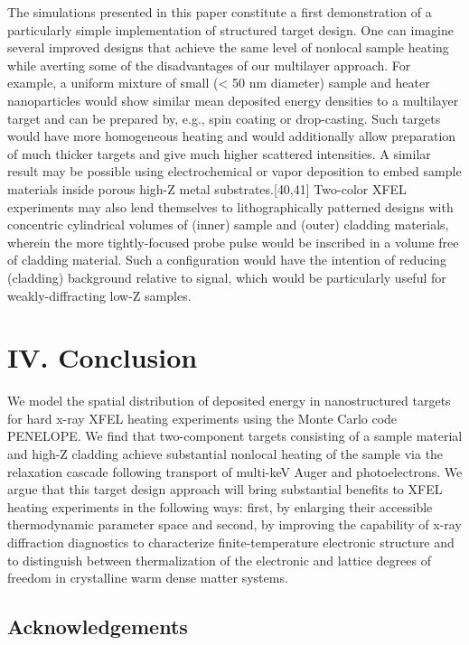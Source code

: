 The simulations presented in this paper constitute a first demonstration
of a particularly simple implementation of structured target design. One
can imagine several improved designs that achieve the same level of
nonlocal sample heating while averting some of the disadvantages of our
multilayer approach. For example, a uniform mixture of small
(\textless{} 50 nm diameter) sample and heater nanoparticles would show
similar mean deposited energy densities to a multilayer target and can
be prepared by, e.g., spin coating or drop-casting. Such targets would
have more homogeneous heating and would additionally allow preparation
of much thicker targets and give much higher scattered intensities. A
similar result may be possible using electrochemical or vapor deposition
to embed sample materials inside porous high-Z metal
substrates.{[}40,41{]} Two-color XFEL experiments may also lend
themselves to lithographically patterned designs with concentric
cylindrical volumes of (inner) sample and (outer) cladding materials,
wherein the more tightly-focused probe pulse would be inscribed in a
volume free of cladding material. Such a configuration would have the
intention of reducing (cladding) background relative to signal, which
would be particularly useful for weakly-diffracting low-Z samples.

\section{IV. Conclusion}

We model the spatial distribution of deposited energy in nanostructured
targets for hard x-ray XFEL heating experiments using the Monte Carlo
code PENELOPE. We find that two-component targets consisting of a sample
material and high-Z cladding achieve substantial nonlocal heating of the
sample via the relaxation cascade following transport of multi-keV Auger
and photoelectrons. We argue that this target design approach will bring
substantial benefits to XFEL heating experiments in the following ways:
first, by enlarging their accessible thermodynamic parameter space and
second, by improving the capability of x-ray diffraction diagnostics to
characterize finite-temperature electronic structure and to distinguish
between thermalization of the electronic and lattice degrees of freedom
in crystalline warm dense matter systems.

\subsection{Acknowledgements}

